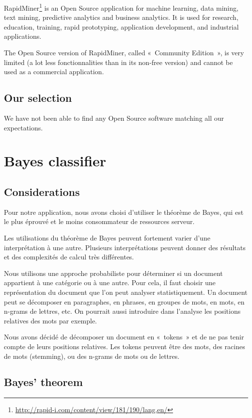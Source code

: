 \documentclass[a4paper,11pt]{article}
\begin{document}
RapidMiner\footnote{\url{http://rapid-i.com/content/view/181/190/lang,en/}} is
an Open Source application for machine learning, data mining, text
mining, predictive analytics and business analytics.
It is used for research, education, training, rapid prototyping, application
development, and industrial applications.

The Open Source version of RapidMiner, called «~Community Edition~», is very
limited (a lot less fonctionnalities than in its non-free version) and cannot
be used as a commercial application.

\subsection{Our selection}

We have not been able to find any Open Source software matching all our
expectations.


\section{Bayes classifier}

\subsection{Considerations}

Pour notre application, nous avons choisi d'utiliser le théorème de Bayes,
qui est le plus éprouvé et le moins consommateur de ressources serveur.

Les utilisations du théorème de Bayes peuvent fortement varier d'une
interprétation à une autre. Plusieurs interprétations peuvent donner des
résultats et des complexités de calcul très différentes.

Nous utilisons une approche probabiliste pour déterminer si un document
appartient à une catégorie ou à une autre. Pour cela, il faut choisir une
représentation du document que l'on peut analyser statistiquement. Un document
peut se décomposer en paragraphes, en phrases, en groupes de mots, en mots, en
n-grams de lettres, etc. On pourrait aussi introduire dans l'analyse les
positions relatives des mots par exemple.

Nous avons décidé de décomposer un document en «~tokens~» et de ne pas tenir
compte de leurs positions relatives. Les tokens peuvent être des mots, des
racines de mots (stemming), ou des n-grams de mots ou de lettres.


\subsection{Bayes' theorem}
\end{document}
